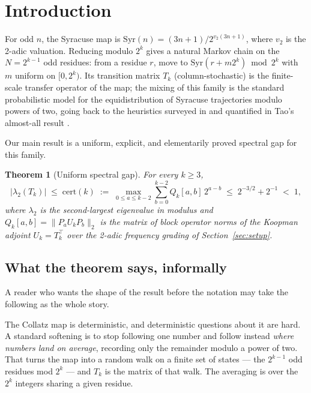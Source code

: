 \documentclass[12pt,a4paper]{article}
\newtheorem{theorem}{Theorem}[section]
\newcommand{\Syr}{\mathrm{Syr}}
\newcommand{\vtwo}{v_2}
\newcommand{\cert}{\mathrm{cert}}
\begin{document}
\section{Introduction}

For odd $n$, the Syracuse map is $\Syr(n) = (3n+1)/2^{\vtwo(3n+1)}$, where $\vtwo$ is the 2-adic
valuation. Reducing modulo $2^k$ gives a natural Markov chain on the $N = 2^{k-1}$ odd residues:
from a residue $r$, move to $\Syr(r + m 2^k) \bmod 2^k$ with $m$ uniform on $[0, 2^k)$. Its
transition matrix $T_k$ (column-stochastic) is the finite-scale transfer operator of the map;
the mixing of this family is the standard probabilistic model for the equidistribution of
Syracuse trajectories modulo powers of two, going back to the heuristics surveyed in
\cite{Lagarias2010} and quantified in Tao's almost-all result \cite{Tao2019}.

Our main result is a uniform, explicit, and elementarily proved spectral gap for this family.

\begin{theorem}[Uniform spectral gap]\label{thm:main}
For every $k \geq 3$,
\[
  |\lambda_2(T_k)| \;\leq\; \cert(k) \;:=\; \max_{0 \le a \le k-2} \sum_{b=0}^{k-2} Q_k[a,b]\, 2^{a-b}
  \;\leq\; 2^{-3/2} + 2^{-1} \;<\; 1,
\]
where $\lambda_2$ is the second-largest eigenvalue in modulus and
$Q_k[a,b] = \|P_a U_k P_b\|_2$ is the matrix of block operator norms of the Koopman adjoint
$U_k = T_k^{\!\top}$ over the 2-adic frequency grading of Section~\ref{sec:setup}.
\end{theorem}

\subsection*{What the theorem says, informally}

A reader who wants the shape of the result before the notation may take the following as the
whole story.

The Collatz map is deterministic, and deterministic questions about it are hard. A standard
softening is to stop following one number and follow instead \emph{where numbers land on
average}, recording only the remainder modulo a power of two. That turns the map into a random
walk on a finite set of states --- the $2^{k-1}$ odd residues mod $2^k$ --- and $T_k$ is the
matrix of that walk. The averaging is over the $2^k$ integers sharing a given residue.
\end{document}

